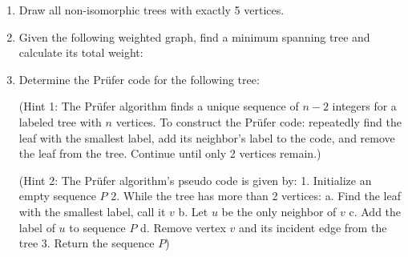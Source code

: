 \documentclass{article}
\theoremstyle{definition}
\begin{document}
\begin{enumerate}
\item Draw all non-isomorphic trees with exactly 5 vertices.

\item Given the following weighted graph, find a minimum spanning tree and calculate its total weight:
\begin{center}
\end{center}

\item Determine the Prüfer code for the following tree:

(Hint 1: The Prüfer algorithm finds a unique sequence of $n-2$ integers for a labeled tree with $n$ vertices. To construct the Prüfer code: repeatedly find the leaf with the smallest label, add its neighbor's label to the code, and remove the leaf from the tree. Continue until only 2 vertices remain.)

(Hint 2: The Prüfer algorithm's pseudo code is given by:
1. Initialize an empty sequence $P$
2. While the tree has more than 2 vertices:
   a. Find the leaf with the smallest label, call it $v$
   b. Let $u$ be the only neighbor of $v$
   c. Add the label of $u$ to sequence $P$
   d. Remove vertex $v$ and its incident edge from the tree
3. Return the sequence $P$)

\begin{center}
\end{center}
\end{enumerate}
\end{document}
